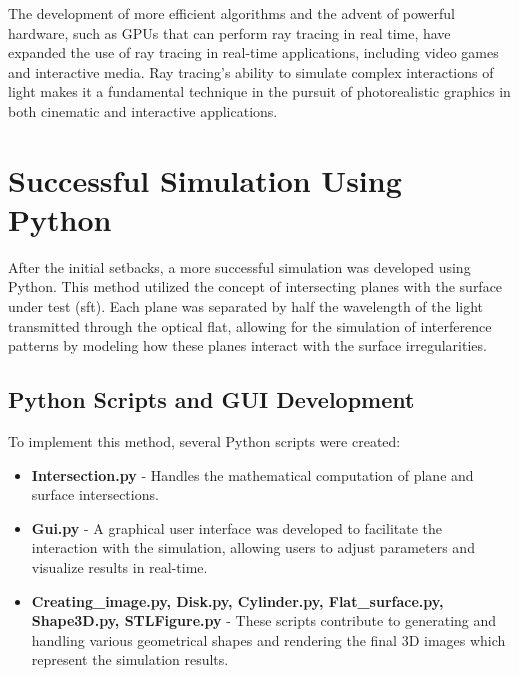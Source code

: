 \documentclass[../main.tex]{subfiles}
\begin{document}
The development of more efficient algorithms and the advent of powerful hardware, such as GPUs that can perform ray tracing in real time, have expanded the use of ray tracing in real-time applications, including video games and interactive media. Ray tracing's ability to simulate complex interactions of light makes it a fundamental technique in the pursuit of photorealistic graphics in both cinematic and interactive applications.

\section{Successful Simulation Using Python}
After the initial setbacks, a more successful simulation was developed using Python. This method utilized the concept of intersecting planes with the surface under test (sft). Each plane was separated by half the wavelength of the light transmitted through the optical flat, allowing for the simulation of interference patterns by modeling how these planes interact with the surface irregularities.

\subsection{Python Scripts and GUI Development}
To implement this method, several Python scripts were created:
\begin{itemize}
    \item \textbf{Intersection.py} - Handles the mathematical computation of plane and surface intersections.
    \item \textbf{Gui.py} - A graphical user interface was developed to facilitate the interaction with the simulation, allowing users to adjust parameters and visualize results in real-time.
    \item \textbf{Creating\_image.py, Disk.py, Cylinder.py, Flat\_surface.py, Shape3D.py, STLFigure.py} - These scripts contribute to generating and handling various geometrical shapes and rendering the final 3D images which represent the simulation results.
\end{itemize}
\end{document}
